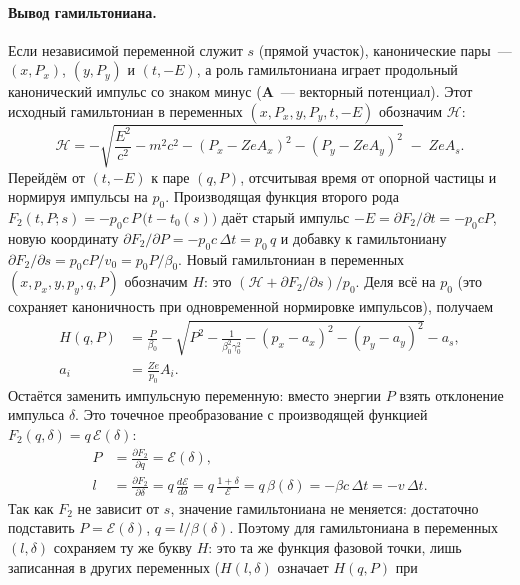 \documentclass[a4paper,11pt]{article}
\numberwithin{equation}{section}
\newcommand{\cE}{\mathcal{E}}
\begin{document}
\paragraph{Вывод гамильтониана.}
Если независимой переменной служит $s$ (прямой участок), канонические пары~--- $(x,P_x)$, $(y,P_y)$ и $(t,-E)$,
а роль гамильтониана играет продольный канонический импульс со знаком минус ($\mathbf A$~--- векторный потенциал).
Этот исходный гамильтониан в переменных $(x,P_x,y,P_y,t,-E)$ обозначим $\mathscr H$:
\begin{equation}
\mathscr H=-\sqrt{\frac{E^2}{c^2}-m^2c^2-(P_x-ZeA_x)^2-(P_y-ZeA_y)^2}\;-\;ZeA_s . \label{eq:H0}
\end{equation}
Перейдём от $(t,-E)$ к паре $(q,P)$, отсчитывая время от опорной частицы и нормируя импульсы на $p_0$.
Производящая функция второго рода
$F_2(t,P;s)=-p_0c\,P\,\big(t-t_0(s)\big)$ даёт старый импульс $-E=\partial F_2/\partial t=-p_0cP$, новую координату
$\partial F_2/\partial P=-p_0c\,\Delta t=p_0\,q$ и добавку к гамильтониану $\partial F_2/\partial s=p_0cP/v_0=p_0P/\beta_0$.
Новый гамильтониан в переменных $(x,p_x,y,p_y,q,P)$ обозначим $H$: это $(\mathscr H+\partial F_2/\partial s)/p_0$.
Деля всё на $p_0$ (это сохраняет каноничность при одновременной нормировке импульсов), получаем
\begin{equation}
\begin{aligned}
H(q,P)&=\frac{P}{\beta_0}-\sqrt{P^2-\frac{1}{\beta_0^2\gamma_0^2}-(p_x-a_x)^2-(p_y-a_y)^2}-a_s,\\
a_i&=\frac{Ze}{p_0}A_i .
\end{aligned} \label{eq:HqP}
\end{equation}
Остаётся заменить импульсную переменную: вместо энергии $P$ взять отклонение импульса $\delta$. Это точечное
преобразование с производящей функцией $F_2(q,\delta)=q\,\cE(\delta)$:
\begin{equation}
\begin{aligned}
P&=\frac{\partial F_2}{\partial q}=\cE(\delta),\\
l&=\frac{\partial F_2}{\partial\delta}=q\,\frac{d\cE}{d\delta}=q\,\frac{1+\delta}{\cE}=q\,\beta(\delta)
=-\beta c\,\Delta t=-v\,\Delta t .
\end{aligned} \label{eq:point}
\end{equation}
Так как $F_2$ не зависит от $s$, значение гамильтониана не меняется: достаточно подставить
$P=\cE(\delta)$, $q=l/\beta(\delta)$. Поэтому для гамильтониана в переменных $(l,\delta)$ сохраняем ту же букву $H$:
это та же функция фазовой точки, лишь записанная в других переменных ($H(l,\delta)$ означает $H(q,P)$ при
\end{document}
